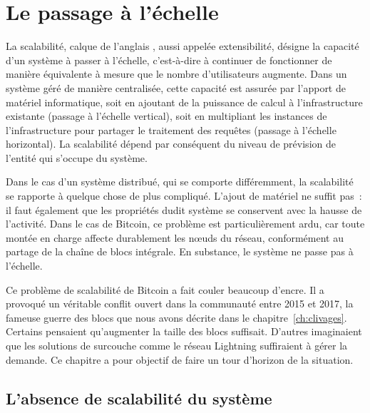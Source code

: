 
\chapter{Le passage à l'échelle}
\label{ch:scalabilite}

La scalabilité, calque de l'anglais , aussi appelée extensibilité, désigne la capacité d'un système à passer à l'échelle, c'est-à-dire à continuer de fonctionner de manière équivalente à mesure que le nombre d'utilisateurs augmente. Dans un système géré de manière centralisée, cette capacité est assurée par l'apport de matériel informatique, soit en ajoutant de la puissance de calcul à l'infrastructure existante (passage à l'échelle vertical), soit en multipliant les instances de l'infrastructure pour partager le traitement des requêtes (passage à l'échelle horizontal). La scalabilité dépend par conséquent du niveau de prévision de l'entité qui s'occupe du système.

Dans le cas d'un système distribué, qui se comporte différemment, la scalabilité se rapporte à quelque chose de plus compliqué. L'ajout de matériel ne suffit pas~: il faut également que les propriétés dudit système se conservent avec la hausse de l'activité. Dans le cas de Bitcoin, ce problème est particulièrement ardu, car toute montée en charge affecte durablement les nœuds du réseau, conformément au partage de la chaîne de blocs intégrale. En substance, le système ne passe pas à l'échelle.

Ce problème de scalabilité de Bitcoin a fait couler beaucoup d'encre. Il a provoqué un véritable conflit ouvert dans la communauté entre 2015 et 2017, la fameuse guerre des blocs que nous avons décrite dans le chapitre~\ref{ch:clivages}. Certains pensaient qu'augmenter la taille des blocs suffisait. D'autres imaginaient que les solutions de surcouche comme le réseau Lightning suffiraient à gérer la demande. Ce chapitre a pour objectif de faire un tour d'horizon de la situation.

\section*{L'absence de scalabilité du système} %

